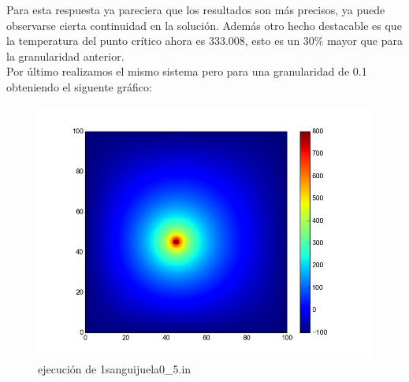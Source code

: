 Para esta respuesta ya pareciera que los resultados son más precisos, ya puede observarse cierta continuidad en la solución. Además otro hecho destacable es que la temperatura del punto crítico ahora es $333.008$, esto es un $30 \%$ mayor que para la granularidad anterior.
\\
Por último realizamos el mismo sistema pero para una granularidad de 0.1 obteniendo el siguente gráfico:

\begin{figure}[H]
\centering
\includegraphics[width=400pt]{otrostests/14.png}
\caption{ejecución de 1sanguijuela0\_5.in}
 
\end{figure}

